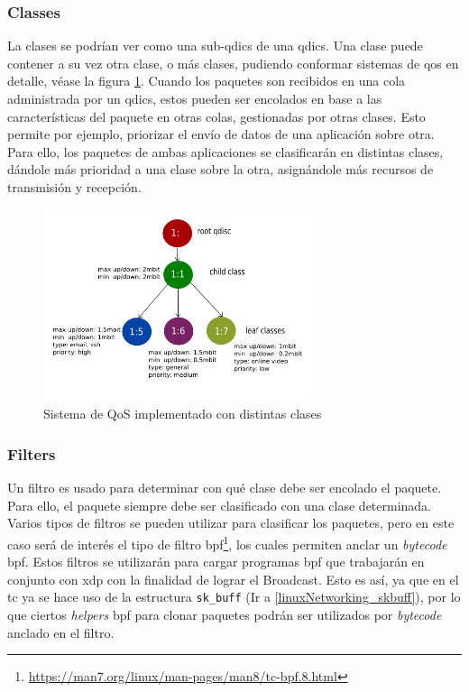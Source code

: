\subsubsection{Classes}

La clases se podrían ver como una sub-\gls{qdics} de una \gls{qdics}. Una clase puede contener a su vez otra clase, o más clases, pudiendo conformar sistemas de \gls{qos} en detalle, véase la figura \ref{fig:linuxNet_tc}. Cuando los paquetes son recibidos en una cola administrada por un \gls{qdics}, estos pueden ser encolados en base a las características del paquete en otras colas,  gestionadas por otras clases. Esto permite por ejemplo, priorizar el envío de datos de una aplicación sobre otra. Para ello, los paquetes de ambas aplicaciones se clasificarán en distintas clases, dándole más prioridad a una clase sobre la otra, asignándole más recursos de transmisión y recepción.

\begin{figure}[ht]
    \centering
    \includegraphics[width=8cm]{archivos/img/teoria/tc_qdisc_example_implementation.png}
    \caption{Sistema de QoS implementado con distintas clases \cite{qdiscs}}
    \label{fig:linuxNet_tc}
\end{figure}

\subsubsection{Filters}

Un filtro es usado para determinar con qué clase debe ser encolado el paquete. Para ello, el paquete siempre debe ser clasificado con una clase determinada. Varios tipos de filtros se pueden utilizar para clasificar los paquetes, pero en este caso será de interés el tipo de filtro \gls{bpf}\footnote{\url{https://man7.org/linux/man-pages/man8/tc-bpf.8.html}}, los cuales permiten anclar un \textit{bytecode} \gls{bpf}. Estos filtros se utilizarán para cargar programas \gls{bpf} que trabajarán en conjunto con \gls{xdp} con la finalidad de lograr el Broadcast. Esto es así, ya que en el \gls{tc} ya se hace uso de la estructura \texttt{sk\_buff} (Ir a \ref{linuxNetworking_skbuff}), por lo que ciertos \textit{helpers} \gls{bpf} para clonar paquetes podrán ser utilizados por \textit{bytecode} anclado en el filtro.


